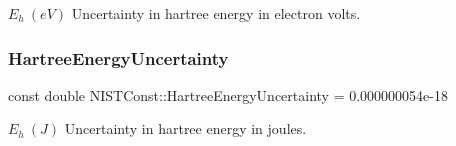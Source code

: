 $E_h \ (eV)$ Uncertainty in hartree energy in electron volts. \mbox{\label{group___n_i_s_t_const-_hartree_energy_gaabdf38a4c491ca0f606bf042c8479801}} 
\subsubsection{\texorpdfstring{Hartree\+Energy\+Uncertainty}{HartreeEnergyUncertainty}}
{\footnotesize\ttfamily const double N\+I\+S\+T\+Const\+::\+Hartree\+Energy\+Uncertainty = 0.\+000000054e-\/18}

$E_h \ (J)$ Uncertainty in hartree energy in joules. 